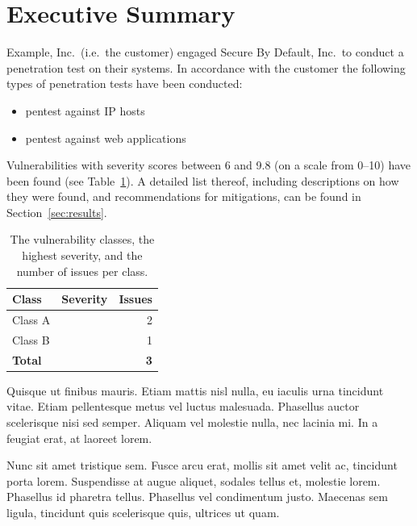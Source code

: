 \documentclass[a4paper]{article}
\newcommand{\minmalseveritygaugeH}[2][1]{
  \begin{tikzpicture}[scale=#1, baseline=-0.5ex]
    \filldraw[fill=white, draw=black] (0, -0.3) rectangle (10, 0.3);
    \filldraw[fill=black, draw=black] (0, -0.3) rectangle (#2, 0.3);
  \end{tikzpicture}
}
\begin{document}
\clearpage
\section*{Executive Summary}

Example, Inc.\ (i.e.\ the customer) engaged Secure By Default, Inc.\ to conduct a penetration test on their systems.
In accordance with the customer the following types of penetration tests have been conducted:

\begin{itemize}
      \item pentest against IP hosts

      \item pentest against web applications

  \end{itemize}

Vulnerabilities with severity scores between 6 and 9.8 (on a scale from 0--10) have been found (see Table~\ref{tab:vulnerabilities}).
A detailed list thereof, including descriptions on how they were found, and recommendations for mitigations, can be found in Section~\ref{sec:results}.

\begin{table}[h!]
  \centering
  \caption{The vulnerability classes, the highest severity, and the number of issues per class.}
  \label{tab:vulnerabilities}
  \begin{tabular}{lcr}
    \textbf{Class} & \textbf{Severity} & \textbf{Issues} \\
    \hline
          Class A & \minmalseveritygaugeH[0.2]{9.8} & 2 \\
          Class B & \minmalseveritygaugeH[0.2]{6} & 1 \\
        \hline
    \textbf{Total} & ~ & \textbf{3}
  \end{tabular}
\end{table}

Quisque ut finibus mauris.
Etiam mattis nisl nulla, eu iaculis urna tincidunt vitae.
Etiam pellentesque metus vel luctus malesuada.
Phasellus auctor scelerisque nisi sed semper.
Aliquam vel molestie nulla, nec lacinia mi.
In a feugiat erat, at laoreet lorem.

Nunc sit amet tristique sem.
Fusce arcu erat, mollis sit amet velit ac, tincidunt porta lorem.
Suspendisse at augue aliquet, sodales tellus et, molestie lorem.
Phasellus id pharetra tellus.
Phasellus vel condimentum justo.
Maecenas sem ligula, tincidunt quis scelerisque quis, ultrices ut quam.
\end{document}
